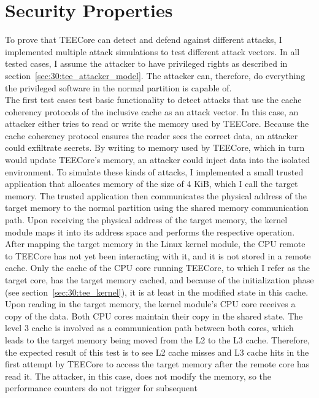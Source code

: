 \section{Security Properties}
\label{eval:sec}
To prove that TEECore can detect and defend against different attacks, I
implemented multiple attack simulations to test different attack vectors. In all
tested cases, I assume the attacker to have privileged rights as described in
section~\ref{sec:30:tee_attacker_model}. The attacker can, therefore, do
everything the privileged software in the normal partition is capable of.\\

The first test cases test basic functionality to detect attacks that use the
cache coherency protocols of the inclusive cache as an attack vector. In this
case, an attacker either tries to read or write the memory used by TEECore.
Because the cache coherency protocol ensures the reader sees the correct data,
an attacker could exfiltrate secrets. By writing to memory used by TEECore,
which in turn would update TEECore's memory, an attacker could inject data into
the isolated environment. To simulate these kinds of attacks, I implemented a
small trusted application that allocates memory of the size of 4 KiB, which I
call the target memory. The trusted application then communicates the physical
address of the target memory to the normal partition using the shared memory
communication path. Upon receiving the physical address of the target memory,
the kernel module maps it into its address space and performs the respective
operation. After mapping the target memory in the Linux kernel module, the CPU
remote to TEECore has not yet been interacting with it, and it is not stored in
a remote cache. Only the cache of the CPU core running TEECore, to which I refer
as the target core, has the target memory cached, and because of the
initialization phase (see section~\ref{sec:30:tee_kernel}), it is at least in
the modified state in this cache. Upon reading in the target memory, the kernel
module's CPU core receives a copy of the data. Both CPU cores maintain their
copy in the shared state. The level 3 cache is involved as a communication path
between both cores, which leads to the target memory being moved from the L2 to
the L3 cache. Therefore, the expected result of this test is to see L2 cache
misses and L3 cache hits in the first attempt by TEECore to access the target
memory after the remote core has read it. The attacker, in this case, does not
modify the memory, so the performance counters do not trigger for subsequent
